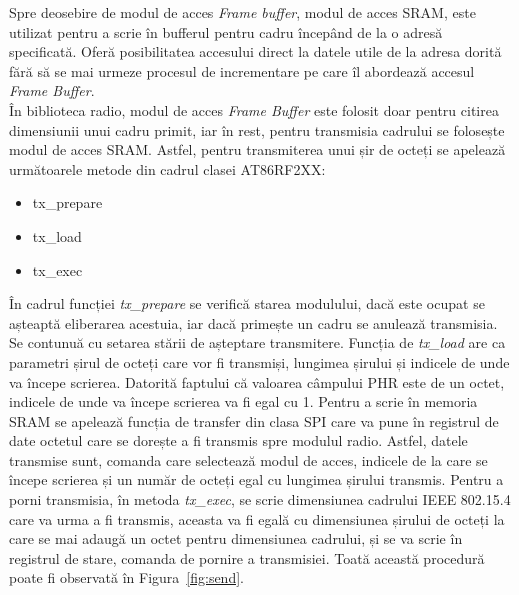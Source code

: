 \documentclass[12pt,a4paper]{report}
\begin{document}
Spre deosebire de modul de acces \textit{Frame buffer}, modul de acces SRAM, este utilizat pentru a scrie în bufferul pentru cadru începând de la o adresă specificată. Oferă posibilitatea accesului direct la datele utile de la adresa dorită fără să se mai urmeze procesul de incrementare pe care îl abordează accesul \textit{Frame Buffer}.\\
În biblioteca radio, modul de acces \textit{Frame Buffer} este folosit doar pentru citirea dimensiunii unui cadru primit, iar în rest, pentru transmisia cadrului se folosește modul de acces SRAM. Astfel, pentru transmiterea unui șir de octeți se apelează următoarele metode din cadrul clasei AT86RF2XX:
\begin{itemize}
\item tx\_prepare
\item tx\_load
\item tx\_exec
\end{itemize}
În cadrul funcției \textit{tx\_prepare} se verifică starea modulului,  dacă este ocupat se așteaptă eliberarea acestuia, iar dacă primește un cadru se anulează transmisia. Se contunuă cu setarea stării de așteptare transmitere.
Funcția de \textit{tx\_load} are ca parametri șirul de octeți care vor fi transmiși, lungimea șirului și indicele de unde va începe scrierea. Datorită faptului că valoarea câmpului PHR este de un octet, indicele de unde va începe scrierea va fi egal cu 1. Pentru a scrie în memoria SRAM se apelează funcția de transfer din clasa SPI care va pune în registrul de date octetul care se dorește a fi transmis spre modulul radio. Astfel, datele transmise sunt, comanda care selectează modul de acces, indicele de la care se începe scrierea și un număr de octeți egal cu lungimea șirului transmis.
Pentru a porni transmisia, în metoda \textit{tx\_exec}, se scrie dimensiunea cadrului IEEE 802.15.4 care va urma a fi transmis, aceasta va fi egală cu dimensiunea șirului de octeți la care se mai adaugă un octet pentru dimensiunea cadrului, și se va scrie în registrul de stare, comanda de pornire a transmisiei. Toată această procedură poate fi observată în Figura~\ref{fig:send}.
\end{document}
